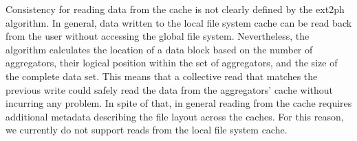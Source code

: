 
Consistency for reading data from the cache is not clearly defined by the ext2ph algorithm. In general, data written to the local file system cache can be read back from the user without accessing the global file system. Nevertheless, the algorithm calculates the location of a data block based on the number of aggregators, their logical position within the set of aggregators, and the size of the complete data set. This means that a collective read that matches the previous write could safely read the data from the aggregators' cache without incurring any problem. In spite of that, in general reading from the cache requires additional metadata describing the file layout across the caches. For this reason, we currently do not support reads from the local file system cache.


